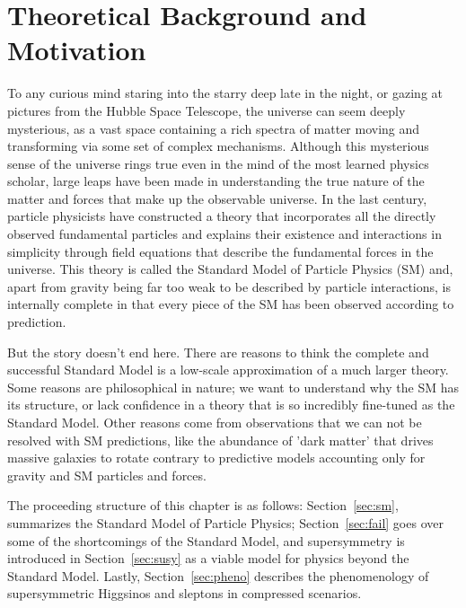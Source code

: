 \chapter{Theoretical Background and Motivation}
To any curious mind staring into the starry deep late in the night, or gazing at pictures from the Hubble Space Telescope, the universe can seem deeply mysterious, as a vast space containing a rich spectra of matter moving and transforming via some set of complex mechanisms.  Although this mysterious sense of the universe rings true even in the mind of the most learned physics scholar, large leaps have been made in understanding the true nature of the matter and forces that make up the observable universe.   In the last century, particle physicists have constructed a theory that incorporates all the directly observed fundamental particles and explains their existence and interactions in simplicity through field equations that describe the fundamental forces in the universe.  This theory is called the Standard Model of Particle Physics (SM) and, apart from gravity being far too weak to be described by particle interactions, is internally complete in that every piece of the SM has been observed according to prediction.

But the story doesn't end here.  There are reasons to think the complete and successful Standard Model is a low-scale approximation of a much larger theory.  Some reasons are philosophical in nature; we want to understand why the SM has its structure, or lack confidence in a theory that is so incredibly fine-tuned as the Standard Model.  Other reasons come from observations that we can not be resolved with SM predictions, like the  abundance of 'dark matter' that drives massive galaxies to rotate contrary to predictive models accounting only for gravity and SM particles and forces.

The proceeding structure of this chapter is as follows: Section~\ref{sec:sm}, summarizes the Standard Model of Particle Physics; %
Section~\ref{sec:fail} goes over some of the shortcomings of the Standard Model, and supersymmetry is introduced in Section~\ref{sec:susy} as a viable model for physics beyond the Standard Model.  Lastly, Section~\ref{sec:pheno} describes the phenomenology of supersymmetric Higgsinos and sleptons in compressed scenarios.

